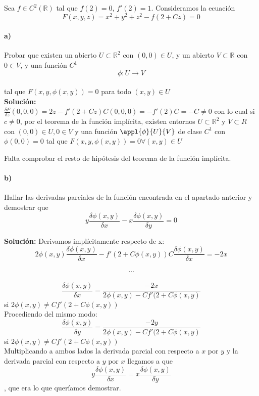 Sea $f\in C^2(\mathbb{R})$ tal que $f(2) = 0$, $f'(2)=1$. Consideramos la ecuación \\$$F(x,y,z) = x^2+y^2+z^2-f(2+Cz)=0$$

\paragraph{a)} Probar que existen un abierto $U\subset \mathbb{R}^2$ con $(0,0)\in U$, y un abierto $V\subset \mathbb{R}$ con $0\in V$, y una función $C^1$\\$$\phi: U \rightarrow V$$\\tal que $F(x, y, \phi (x, y)) = 0$ para todo $(x,y) \in U$\\

\textbf{Solución:}\\
$\frac{\delta F}{\delta z}(0,0,0) = 2z - f'(2+Cz)C (0,0,0) =-f'(2)C = -C \neq 0$
con lo cual si $c\neq 0$, por el teorema de la función implícita, existen entornos $U\subset \mathbb{R}^2$ y $V\subset{R}$ con $(0,0)\in U, 0\in V$ y una función $\appl{\phi}{U}{V}$ de clase $C^1$ con $\phi (0,0) = 0$ tal que $F(x,y,\phi (x,y)) = 0 \forall (x,y)\in U$

Falta comprobar el resto de hipótesis del teorema de la función implícita.

\paragraph{b)} Hallar las derivadas parciales de la función encontrada en el apartado anterior y demostrar que \\

$$y\frac{\delta \phi (x,y)}{\delta x} - x\frac{\delta \phi (x,y)}{\delta y} = 0$$

\textbf{Solución:}
Derivamos implícitamente respecto de x:\\
$$2\phi (x,y) \frac{\delta \phi (x,y)}{\delta x} - f'(2+C\phi (x,y))C\frac{\delta \phi (x,y)}{\delta x}=-2x$$\\
$$\hdots$$\\
$$\frac{\delta \phi (x,y)}{\delta x} = \frac{-2x}{2\phi (x,y) - Cf'(2+C\phi (x,y)}$$ si $2\phi (x,y) \neq Cf'(2+C\phi (x,y))$
\\Procediendo del mismo modo: \\
$$\frac{\delta \phi (x,y)}{\delta y} = \frac{-2y}{2\phi (x,y) - Cf'(2+C\phi (x,y)}$$ si $2\phi (x,y) \neq Cf'(2+C\phi (x,y))$\\
Multiplicando a ambos lados la derivada parcial con respecto a $x$ por $y$ y la derivada parcial con respecto a $y$ por $x$ llegamos a que\\ $$y\frac{\delta \phi (x,y)}{\delta x} = x\frac{\delta \phi (x,y)}{\delta y}$$, que era lo que queríamos demostrar.

